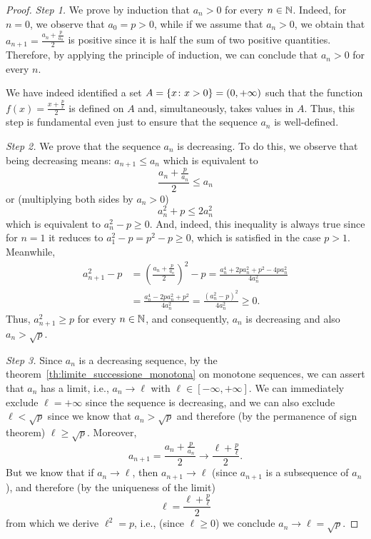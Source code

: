 \begin{proof}
\emph{Step 1.} We prove by induction that $a_n>0$ for every $n\in {\mathbb N}$.
Indeed, for $n=0$, we observe that $a_0=p>0$, while if we assume that
$a_n>0$, we obtain that $a_{n+1} = \frac{a_n + \frac p {a_n}}2$ is positive
since
it is half the sum of two positive quantities. Therefore, by applying the
principle of induction, we can conclude that $a_n>0$ for every $n$.

We have indeed identified a set $A={\left\{ x\colon x>0 \right\}} = (0,
+\infty)$ such that the function $f(x) = \frac{x + \frac p x}{2}$ is defined
on $A$ and, simultaneously, takes values in $A$.
Thus, this step is fundamental even just to
ensure that the sequence $a_n$ is well-defined.

\emph{Step 2.} We prove that the sequence $a_n$ is decreasing.
To do this, we observe that being decreasing means:
$ a_{n+1} \le a_n$
which is equivalent to
\[
\frac{a_n + \frac p {a_n}}{2} \le a_n
\]
or (multiplying both sides by $a_n>0$)
\[
a_n^2 + p \le 2 a_n^2
\]
which is equivalent to $a_n^2 - p \ge 0$. And, indeed, this
inequality is always true since for $n=1$ it reduces to $a_1^2 - p
= p^2 - p \ge 0$, which is satisfied in the case $p>1$. Meanwhile,
\begin{align*}
a_{n+1}^2 - p & = \left(\frac{a_n+\frac p{a_n}}{2}\right)^2 - p
= \frac{a_n^4 + 2 p a_n^2 + p^2 - 4 p a_n^2}{4 a_n^2} \\
& = \frac{a_n^4 - 2 p a_n^2 + p^2}{4 a_n^2}
 = \frac{\left(a_n^2 - p\right)^2}{4a_n^2} \ge 0.
\end{align*}
Thus, $a_{n+1}^2 \ge p$ for every $n\in {\mathbb N}$, and consequently, $a_n$ is
decreasing and also $a_n > \sqrt p$.

\emph{Step 3.}
Since $a_n$ is a decreasing sequence,
by the theorem~\ref{th:limite_successione_monotona} on monotone sequences, we
can
assert that $a_n$ has a limit, i.e., $a_n \to \ell$ with $\ell
\in [-\infty, +\infty]$. We can immediately exclude
$\ell=+\infty$ since the sequence is decreasing, and we can
also exclude $\ell<\sqrt{p}$ since we know that $a_n > \sqrt{p}$ and therefore
(by the permanence of sign theorem) $\ell \ge \sqrt p$.
Moreover,
\[
  a_{n+1} = \frac{a_n + \frac p{a_n}}{2} \to \frac{\ell + \frac p \ell}{2}.
\]
But we know that if $a_n\to \ell$, then $a_{n+1}\to \ell$ (since
$a_{n+1}$ is a subsequence of $a_n$), and therefore (by the uniqueness of
the limit)
\begin{equation}\label{ex_1_fixed}
  \ell = \frac{\ell + \frac p \ell}{2}
\end{equation}
from which we derive $\ell^2 = p$, i.e., (since $\ell\ge 0$) we conclude
$a_n \to \ell =
\sqrt p$.
\end{proof}

